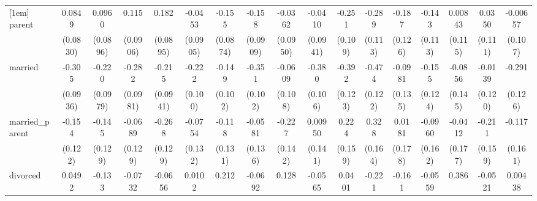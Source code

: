 {\begin{tabular}{l*{16}{c}}
[1em]
parent              &      0.0849         &      0.0960         &       0.115         &       0.182\sym{*}  &     -0.0453         &      -0.155         &      -0.158         &     -0.0362         &     -0.0410         &      -0.251\sym{*}  &      -0.289\sym{*}  &      -0.187         &      -0.143         &     0.00843         &      0.0350         &    -0.00657         \\
                    &    (0.0830)         &    (0.0896)         &    (0.0906)         &    (0.0895)         &    (0.0905)         &    (0.0874)         &    (0.0909)         &    (0.0950)         &    (0.0941)         &     (0.109)         &     (0.113)         &     (0.126)         &     (0.113)         &     (0.115)         &     (0.111)         &     (0.107)         \\
[1em]
married             &      -0.305\sym{**} &      -0.220\sym{*}  &      -0.282\sym{**} &      -0.215\sym{*}  &      -0.222\sym{*}  &      -0.149         &      -0.351\sym{***}&     -0.0609         &      -0.380\sym{***}&      -0.392\sym{**} &      -0.474\sym{***}&     -0.0981         &      -0.155         &     -0.0856         &     -0.0139         &      -0.291\sym{*}  \\
                    &    (0.0936)         &    (0.0979)         &    (0.0981)         &    (0.0941)         &     (0.100)         &     (0.102)         &     (0.102)         &     (0.108)         &     (0.106)         &     (0.123)         &     (0.122)         &     (0.135)         &     (0.124)         &     (0.145)         &     (0.120)         &     (0.126)         \\
[1em]
married\_parent      &      -0.154         &      -0.145         &     -0.0689         &      -0.268\sym{*}  &     -0.0754         &      -0.118         &     -0.0581         &      -0.227         &     0.00950         &       0.224         &       0.328\sym{*}  &      0.0181         &     -0.0960         &     -0.0412         &      -0.211         &      -0.117         \\
                    &     (0.122)         &     (0.129)         &     (0.129)         &     (0.129)         &     (0.132)         &     (0.131)         &     (0.136)         &     (0.142)         &     (0.141)         &     (0.159)         &     (0.164)         &     (0.178)         &     (0.162)         &     (0.177)         &     (0.159)         &     (0.161)         \\
[1em]
divorced            &      0.0492         &      -0.133         &     -0.0732         &     -0.0656         &      0.0102         &       0.212         &     -0.0692         &       0.128         &     -0.0565         &      0.0401         &      -0.221         &      -0.161         &     -0.0559         &       0.386\sym{**} &     -0.0521         &     0.00438         \\

\end{tabular}}

